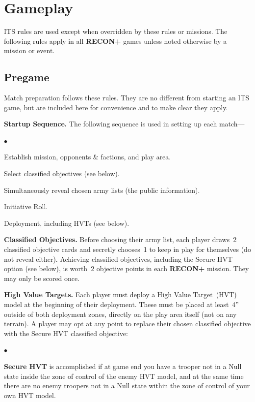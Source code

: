 \documentclass[14pt,dvipsnames]{extarticle}
\newcommand{\missionrule}[1]{\noindent\textbf{#1}\xspace}
\newenvironment{squishitemize}
{\begin{list}{$\bullet$}{%
    \setlength{\itemsep}{2pt}%
    \setlength{\parsep}{2pt}%
    \setlength{\topsep}{2pt}%
    \setlength{\parskip}{0pt} %
    \renewcommand{\labelitemi}{--}}}
  {\end{list}}
\newcommand{\reconplus}{\textbf{RECON+}\xspace}
\begin{document}
\section{Gameplay}

ITS rules are used except when overridden by these rules or missions.
The following rules apply in all \reconplus games unless noted
otherwise by a mission or event.

\subsection{Pregame}

Match preparation follows these rules.  They are no different from
starting an ITS game, but are included here for convenience and to
make clear they apply.

\missionrule{Startup Sequence.}  The following sequence is used in
setting up each match---

\begin{squishitemize}  
\item Establish mission, opponents \& factions, and play area.

\item Select classified objectives (see below).
  
\item Simultaneously reveal chosen army lists (the public information).

\item Initiative Roll.

\item Deployment, including HVTs (see below).
\end{squishitemize}

\missionrule{Classified Objectives.}  Before choosing their army list,
each player draws~2 classified objective cards and secretly chooses~1
to keep in play for themselves (do not reveal either).  Achieving
classified objectives, including the Secure HVT option (see below), is
worth~2 objective points in each \reconplus mission.  They may only be
scored once.

\missionrule{High Value Targets.}  Each player must deploy a High
Value Target~(HVT) model at the beginning of their deployment.  These
must be placed at least~4'' outside of both deployment zones, directly
on the play area itself (not on any terrain).  A player may opt at any
point to replace their chosen classified objective with the Secure HVT
classified objective:

\begin{squishitemize}
\item \textbf{Secure HVT} is accomplished if at game end you have a
  trooper not in a Null state inside the zone of control of the enemy
  HVT model, and at the same time there are no enemy troopers not in a
  Null state within the zone of control of your own HVT model.
\end{squishitemize}
\end{document}
